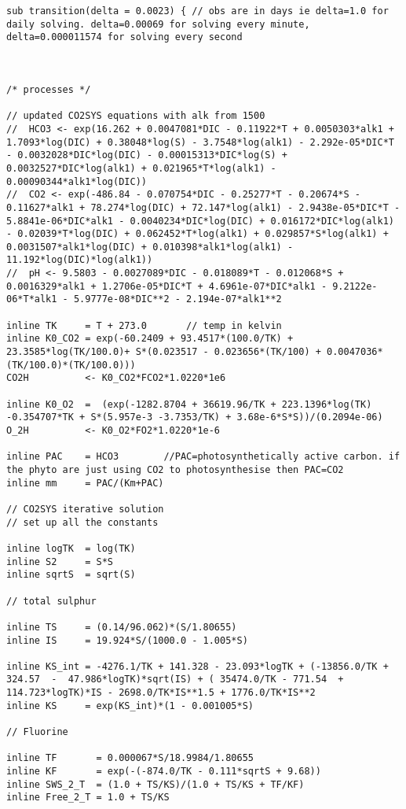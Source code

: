 \documentclass{ruthesis}
\begin{document}
\begin{verbatim}
sub transition(delta = 0.0023) { // obs are in days ie delta=1.0 for daily solving. delta=0.00069 for solving every minute, delta=0.000011574 for solving every second



/* processes */

// updated CO2SYS equations with alk from 1500
//	HCO3 <- exp(16.262 + 0.0047081*DIC - 0.11922*T + 0.0050303*alk1 + 1.7093*log(DIC) + 0.38048*log(S) - 3.7548*log(alk1) - 2.292e-05*DIC*T - 0.0032028*DIC*log(DIC) - 0.00015313*DIC*log(S) + 0.0032527*DIC*log(alk1) + 0.021965*T*log(alk1) - 0.00090344*alk1*log(DIC)) 
//	CO2 <- exp(-486.84 - 0.070754*DIC - 0.25277*T - 0.20674*S - 0.11627*alk1 + 78.274*log(DIC) + 72.147*log(alk1) - 2.9438e-05*DIC*T - 5.8841e-06*DIC*alk1 - 0.0040234*DIC*log(DIC) + 0.016172*DIC*log(alk1) - 0.02039*T*log(DIC) + 0.062452*T*log(alk1) + 0.029857*S*log(alk1) + 0.0031507*alk1*log(DIC) + 0.010398*alk1*log(alk1) - 11.192*log(DIC)*log(alk1))
//	pH <- 9.5803 - 0.0027089*DIC - 0.018089*T - 0.012068*S + 0.0016329*alk1 + 1.2706e-05*DIC*T + 4.6961e-07*DIC*alk1 - 9.2122e-06*T*alk1 - 5.9777e-08*DIC**2 - 2.194e-07*alk1**2 

inline TK     = T + 273.0		// temp in kelvin
inline K0_CO2 = exp(-60.2409 + 93.4517*(100.0/TK) + 23.3585*log(TK/100.0)+ S*(0.023517 - 0.023656*(TK/100) + 0.0047036*(TK/100.0)*(TK/100.0)))
CO2H          <- K0_CO2*FCO2*1.0220*1e6

inline K0_O2  =  (exp(-1282.8704 + 36619.96/TK + 223.1396*log(TK) -0.354707*TK + S*(5.957e-3 -3.7353/TK) + 3.68e-6*S*S))/(0.2094e-06)
O_2H 	      <- K0_O2*FO2*1.0220*1e-6

inline PAC    = HCO3  		//PAC=photosynthetically active carbon. if the phyto are just using CO2 to photosynthesise then PAC=CO2
inline mm     = PAC/(Km+PAC)

// CO2SYS iterative solution
// set up all the constants

inline logTK  = log(TK)
inline S2     = S*S
inline sqrtS  = sqrt(S)

// total sulphur

inline TS     = (0.14/96.062)*(S/1.80655)
inline IS     = 19.924*S/(1000.0 - 1.005*S)

inline KS_int = -4276.1/TK + 141.328 - 23.093*logTK + (-13856.0/TK + 324.57  -  47.986*logTK)*sqrt(IS) + ( 35474.0/TK - 771.54  + 114.723*logTK)*IS - 2698.0/TK*IS**1.5 + 1776.0/TK*IS**2
inline KS     = exp(KS_int)*(1 - 0.001005*S)

// Fluorine

inline TF       = 0.000067*S/18.9984/1.80655
inline KF       = exp(-(-874.0/TK - 0.111*sqrtS + 9.68))
inline SWS_2_T  = (1.0 + TS/KS)/(1.0 + TS/KS + TF/KF)
inline Free_2_T = 1.0 + TS/KS


\end{verbatim}
\end{document}
